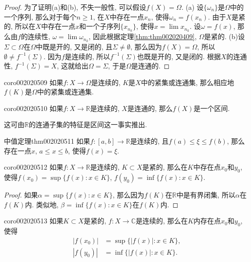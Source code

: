 \begin{proof}
为了证明(a)和(b), 不失一般性, 可以假设$f(X) = \Omega$. (a) 设$\{\omega_n\}$是$\Omega$中的一个序列, 那么对于每个$n \ge 1$, 在$X$中存在一点$x_n$, 使得$\omega_n = f(x_n)$. 由于$X$是紧的, 所以在$X$中存在一点$x$和一个子序列$\{x_{n_k}\}$, 使得$x = \lim{x_{n_k}}$. 设$\omega = f(x)$, 那么由$f$的连续性, $\omega = \lim{\omega_{n_k}}$, 因此根据定理\ref{thm:thm002020409}, $\Omega$是紧的. (b)设$\Sigma \subset \Omega$在$\Omega$中既是开的, 又是闭的, 且$\Sigma \neq \emptyset$, 那么因为$f(X) = \Omega$, 所以$\emptyset \neq f^{-1}(\Sigma)$. 因为$f$是连续的, 所以$f^{-1}(\Sigma)$也既是开的, 又是闭的. 根据$X$的连通性, $f^{-1}(\Sigma) = X$, 这就给出$\Omega = \Sigma$, 于是$\Omega$是连通的. 
\end{proof}

\begin{corollary}{}{coro002020509}
如果$f:X \to \Omega$是连续的, $K$是$X$中的紧集或连通集, 那么相应地$f(K)$是$\Omega$中的紧集或连通集. 
\end{corollary}

\begin{corollary}{}{coro002020510}
如果$f:X \to \mathbb{R}$是连续的, $X$是连通的, 那么$f(X)$是一个区间. 
\end{corollary}

这可由$\mathbb{R}$的连通子集的特征是区间这一事实推出. 

\begin{theorem}{中值定理}{thm002020511}
如果$f:[a, b] \to \mathbb{R}$是连续的, 且$f(a) \le \xi \le f(b)$, 那么存在一点$x$, $a \le x \le b$, 使得$f(x) = \xi$. 
\end{theorem}

\begin{corollary}{}{coro002020512}
如果$f:X \to \mathbb{R}$是连续的, $K \subset X$是紧的, 那么在$K$中存在点$x_0$和$y_0$, 使得$f(x_0) = \sup\{f(x):x \in K\}$, $f(y_0) = \inf\{f(x): x \in K\}$. 
\end{corollary}

\begin{proof}
如果$\alpha = \sup\{f(x):x\in K\}$, 那么因为$f(K)$在$\mathbb{R}$中是有界闭集, 所以$\alpha$在$f(K)$内. 类似地, $\beta = \inf\{f(x): x \in K\}$在$f(K)$内. 
\end{proof}

\begin{corollary}{}{coro002020513}
如果$K \subset X$是紧的, $f: X \to \mathbb{C}$是连续的, 那么在$K$内存在点$x_0$和$y_0$, 使得
\[
\begin{aligned}
|f(x_0)| &= \sup\{|f(x)|:x \in K\},\\ 
|f(y_0)| &= \inf\{|f(x)|: x \in K\}.
\end{aligned}
\]
\end{corollary}

